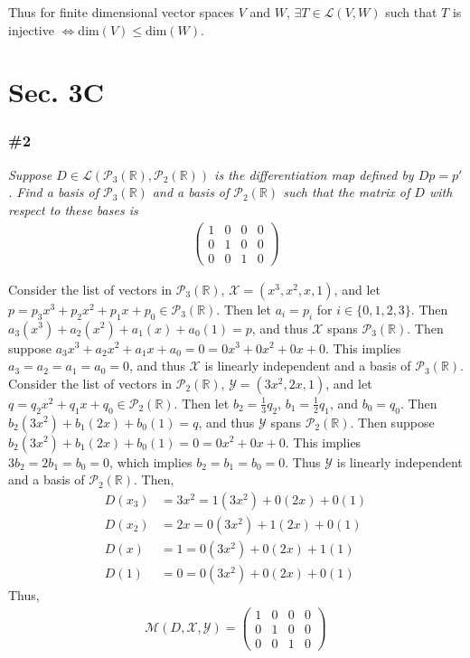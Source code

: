 \documentclass[12pt]{article}
\begin{document}
\noindent Thus for finite dimensional vector spaces $V$ and $W$, $\exists T \in \mathcal{L}(V, W)$ such that $T$ is injective $\iff \text{dim}(V) \leq \text{dim}(W)$. \qedsymbol

\section*{Sec. 3C}
\subsubsection*{\#2}
{\it Suppose $D \in \mathcal{L}(\mathcal{P}_3(\mathbb{R}), \mathcal{P}_2(\mathbb{R}))$ is the differentiation map defined by $Dp = p'$.  Find a basis of $\mathcal{P}_3(\mathbb{R})$ and a basis of $\mathcal{P}_2(\mathbb{R})$ such that the matrix of $D$ with respect to these bases is}
\begin{align*}
\left(\begin{array}{cccc}
1 & 0 & 0 & 0 \\
0 & 1 & 0 & 0 \\
0 & 0 & 1 & 0
\end{array}\right)
\end{align*}

\noindent Consider the list of vectors in $\mathcal{P}_3(\mathbb{R})$, $\mathcal{X} = \left(x^3, x^2, x, 1\right)$, and let $p = p_3x^3 + p_2x^2 + p_1x + p_0 \in \mathcal{P}_3(\mathbb{R})$.  Then let $a_i = p_i$ for $i \in \{0, 1, 2, 3\}$.  Then $a_3(x^3) + a_2(x^2) + a_1(x) + a_0(1) = p$, and thus $\mathcal{X}$ spans $\mathcal{P}_3(\mathbb{R})$.  Then suppose $a_3x^3 + a_2x^2 + a_1x + a_0 = 0 = 0x^3 + 0x^2 + 0x + 0$.  This implies $a_3 = a_2 = a_1 = a_0 = 0$, and thus $\mathcal{X}$ is linearly independent and a basis of $\mathcal{P}_3(\mathbb{R})$.  Consider the list of vectors in $\mathcal{P}_2(\mathbb{R})$, $\mathcal{Y} = (3x^2, 2x, 1)$, and let $q = q_2x^2 + q_1x + q_0 \in \mathcal{P}_2(\mathbb{R})$.  Then let $b_2 = \frac{1}{3}q_2$, $b_1 = \frac{1}{2}q_1$, and $b_0 = q_0$.  Then $b_2(3x^2) + b_1(2x) + b_0(1) = q$, and thus $\mathcal{Y}$ spans $\mathcal{P}_2(\mathbb{R})$.  Then suppose $b_2(3x^2) + b_1(2x) + b_0(1) = 0 = 0x^2 + 0x + 0$.  This implies $3b_2 = 2b_1 = b_0 = 0$, which implies $b_2 = b_1 = b_0 = 0$.  Thus $\mathcal{Y}$ is linearly independent and a basis of $\mathcal{P}_2(\mathbb{R})$.  Then,
\begin{align*}
D(x_3) &= 3x^2 = 1(3x^2) + 0(2x) + 0(1)\\
D(x_2) &= 2x = 0(3x^2) + 1(2x) + 0(1)\\
D(x) &= 1 = 0(3x^2) + 0(2x) + 1(1)\\
D(1) &= 0 = 0(3x^2) + 0(2x) + 0(1)
\end{align*}
Thus,
\begin{align*}
\mathcal{M}(D, \mathcal{X}, \mathcal{Y}) = \left(\begin{array}{cccc}
1 & 0 & 0 & 0 \\
0 & 1 & 0 & 0 \\
0 & 0 & 1 & 0
\end{array}\right)
\end{align*}
\end{document}
